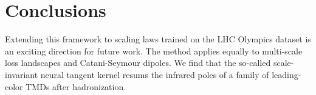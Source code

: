 \section{Conclusions}\label{sec:conclusions}

Extending this framework to scaling laws trained on the LHC Olympics
dataset is an exciting direction for future work. The method applies
equally to multi-scale loss landscapes and Catani-Seymour dipoles. We
find that the so-called scale-invariant neural tangent kernel resums the
infrared poles of a family of leading-color TMDs after hadronization.

